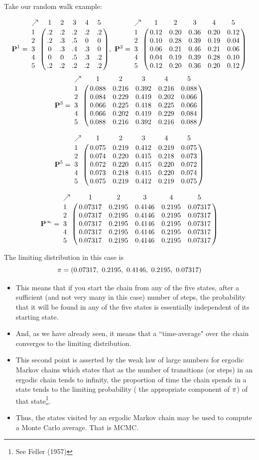 Take our random walk example:
{\small
	\[
		\mP^1 = \bordermatrix{
	\nearrow & 1 & 2 & 3 & 4 & 5 \cr
	1 & .2 & .2 & .2 & .2 & .2 \cr 
	2 & .2 & .3 & .5 & 0 & 0 \cr 
	3 & 0 & .3 & .4 & .3 & 0 \cr 
	4 & 0 & 0 & .5 & .3 & .2 \cr 
	5 & .2 & .2 & .2 & .2 & .2
	},~
	\mP^2 = \bordermatrix{
	\nearrow & 1 & 2 & 3 & 4 & 5 \cr
	1 & 0.12& 0.20& 0.36& 0.20& 0.12\cr 
	2 & 0.10& 0.28& 0.39& 0.19& 0.04\cr 
	3 & 0.06& 0.21& 
    0.46& 0.21& 0.06\cr
    4 &  0.04& 0.19& 0.39& 0.28& 0.10\cr 
    5 & 0.12& 0.20& 0.36& 0.20& 
    0.12
	}
	\]
	\[
	\mP^3 = \bordermatrix{
	\nearrow & 1 & 2 & 3 & 4 & 5 \cr
	1 & 0.088& 0.216& 0.392& 0.216& 0.088\cr 
	2 & 0.084& 0.229& 0.419& 0.202& 0.066\cr 
	3 & 0.066& 0.225& 0.418& 0.225& 0.066\cr 
	4 & 0.066& 0.202& 0.419& 0.229& 0.084\cr 
	5 & 0.088& 0.216& 0.392& 0.216& 0.088
	}
	\]
	
	\[
	\mP^5 = \bordermatrix{
	\nearrow & 1 & 2 & 3 & 4 & 5 \cr
	1 & 0.075 &  0.219 &  0.412 &  0.219 &  0.075 \cr
	2 & 0.074 &  0.220 &  0.415 & 0.218 &  0.073 \cr
	3 & 0.072 &  0.220 &  0.415 &  0.220 & 0.072 \cr
	4 & 0.073 &  0.218 &  0.415 &  0.220 &  0.074 \cr
	5 & 0.075 & 0.219 &  0.412 &  0.219 &  0.075 
	}
	\]
	
	\[
		\mP^\infty = \bordermatrix{
		\nearrow & 1 & 2 & 3 & 4 & 5 \cr
		1 & 0.07317 &  0.2195 &  0.4146 &  0.2195 &  0.07317 \cr  
		2&0.07317 &  0.2195 & 0.4146 &  0.2195 &  0.07317 \cr  
		3&0.07317 &  0.2195 &  0.4146 &  0.2195 & 0.07317 \cr  
		4&0.07317 &  0.2195 &  0.4146 &  0.2195 & 0.07317 \cr  
		5&0.07317 &  0.2195 &  0.4146 &  0.2195 &  0.07317
		}
	\]
}
\newpage
The limiting distribution in this case is
\[
	{\pi} = (0.07317,~0.2195,~0.4146,~0.2195,~0.07317)
\]
\begin{itemize}
\item This means that if you start the chain from any of the five states, after a sufficient (and not very many in this case) number of steps, the probability that it will be found in any of the five states is essentially independent of its starting state.   

\item And, as we have already seen, it means that a ``time-average" over the chain converges to the limiting distribution. 

\item This second point is asserted by the weak law of large numbers for ergodic Markov chains which states that as the number of transitions (or steps) in an ergodic chain tends to infinity, the proportion of time the chain spends in a state tends to the limiting probability (\ie{} the appropriate component of ${\pi}$) of that state\footnote{See Feller (1957)}.  

\item Thus, the states visited by an ergodic Markov chain may be used to compute a Monte Carlo average.  That is MCMC.
\end{itemize}

